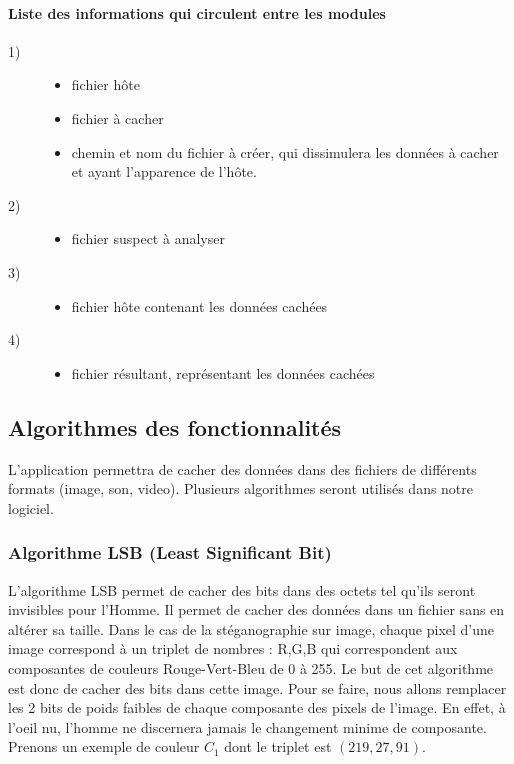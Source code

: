 \documentclass[11pt]{article}
\begin{document}
\paragraph{Liste des informations qui circulent entre les modules}
\begin{description}
\item[1)] 
\begin{itemize}
\item fichier hôte 
\item fichier à cacher 
\item chemin et nom du fichier à créer, qui dissimulera les données à cacher et ayant l'apparence de l'hôte. 
\end{itemize}
\item[2)] 
\begin{itemize}
\item fichier suspect à analyser
\end{itemize}
\item[3)] 
\begin{itemize}
\item fichier hôte contenant les données cachées 
\end{itemize}
\item[4)]
\begin{itemize}
\item fichier résultant, représentant les données cachées 
\end{itemize}
\end{description}

\subsection{Algorithmes des fonctionnalités}
L'application permettra de cacher des données dans des fichiers de différents formats (image, son, video). 
Plusieurs algorithmes seront utilisés dans notre logiciel.

\subsubsection{Algorithme LSB (Least Significant Bit)}
L'algorithme LSB permet de cacher des bits dans des octets tel qu'ils seront invisibles pour l'Homme. 
Il permet de cacher des données dans un fichier sans en altérer sa taille. 
Dans le cas de la stéganographie sur image, chaque pixel d'une image correspond à un triplet de nombres : R,G,B qui correspondent aux composantes de couleurs Rouge-Vert-Bleu de 0 à 255. 
Le but de cet algorithme est donc de cacher des bits dans cette image. Pour se faire, nous allons remplacer les 2 bits de poids faibles de chaque composante des pixels de l'image. 
En effet, à l'oeil nu, l'homme ne discernera jamais le changement minime de composante. 
Prenons un exemple de couleur $C_1$ dont le triplet est $(219,27,91)$. 
\end{document}
